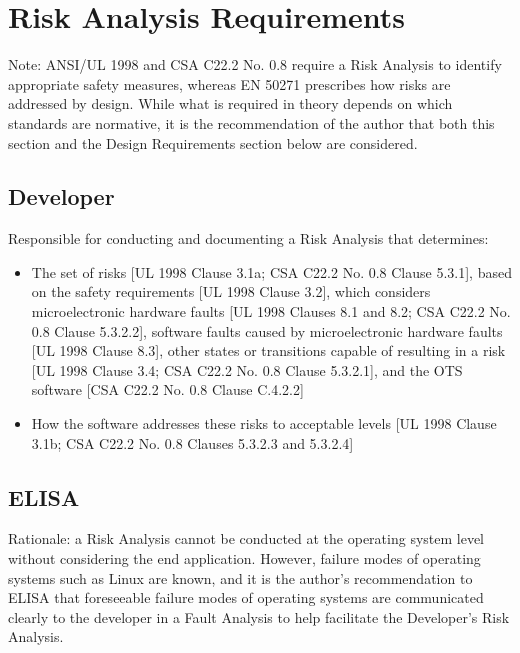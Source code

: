 \documentclass[12pt]{../Common_files/ElisaPaper}
\begin{document}
\section{Risk Analysis Requirements}
Note: ANSI/UL 1998 \cite{UL1998} and CSA C22.2 No. 0.8 \cite{CSA0.8} require a Risk Analysis to identify appropriate safety measures, whereas EN 50271 \cite{EN50271} prescribes how risks are addressed by design.  While what is required in theory depends on which standards are normative, it is the recommendation of the author that both this section and the Design Requirements section below are considered.

\subsection{Developer}
Responsible for conducting and documenting a Risk Analysis that determines:

\begin{itemize}

\item The set of risks [UL 1998 \cite{UL1998} Clause 3.1a; CSA C22.2 No. 0.8 \cite{CSA0.8} Clause 5.3.1], based on the safety requirements [UL 1998 \cite{UL1998} Clause 3.2], which considers microelectronic hardware faults [UL 1998 \cite{UL1998} Clauses 8.1 and 8.2; CSA C22.2 No. 0.8 \cite{CSA0.8} Clause 5.3.2.2], software faults caused by microelectronic hardware faults [UL 1998 \cite{UL1998} Clause 8.3], other states or transitions capable of resulting in a risk [UL 1998 \cite{UL1998} Clause 3.4; CSA C22.2 No. 0.8 \cite{CSA0.8} Clause 5.3.2.1], and the OTS software [CSA C22.2 No. 0.8 \cite{CSA0.8} Clause C.4.2.2]

\item How the software addresses these risks to acceptable levels [UL 1998 \cite{UL1998} Clause 3.1b; CSA C22.2 No. 0.8 \cite{CSA0.8} Clauses 5.3.2.3 and 5.3.2.4]

\end{itemize}

\subsection{ELISA}
Rationale: a Risk Analysis cannot be conducted at the operating system level without considering the end application.  However, failure modes of operating systems such as Linux are known, and it is the author's recommendation to ELISA that foreseeable failure modes of operating systems are communicated clearly to the developer in a Fault Analysis to help facilitate the Developer's Risk Analysis.
\end{document}
